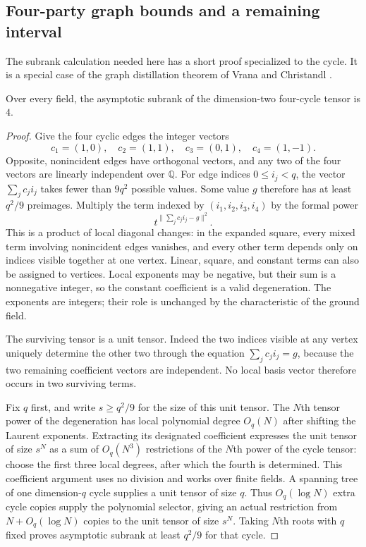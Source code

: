 \subsection{Four-party graph bounds and a remaining interval}
The subrank calculation needed here has a short proof specialized to the cycle. It is a special case of the graph distillation theorem of Vrana and Christandl \cite[Theorem 1, p.~3, and proof in Section 2]{VC2017}.

\begin{lemma}\label{lem:cycle4-subrank}
Over every field, the asymptotic subrank of the dimension-two four-cycle tensor is $4$.
\end{lemma}
\begin{proof}
Give the four cyclic edges the integer vectors
\[
 c_1=(1,0),\quad c_2=(1,1),\quad
 c_3=(0,1),\quad c_4=(1,-1).
\]
Opposite, nonincident edges have orthogonal vectors, and any two of the four vectors are linearly independent over $\mathbb Q$. For edge indices $0\leq i_j<q$, the vector $\sum_jc_ji_j$ takes fewer than $9q^2$ possible values. Some value $g$ therefore has at least $q^2/9$ preimages. Multiply the term indexed by $(i_1,i_2,i_3,i_4)$ by the formal power
\[
 t^{\|\sum_jc_ji_j-g\|^2}.
\]
This is a product of local diagonal changes: in the expanded square, every mixed term involving nonincident edges vanishes, and every other term depends only on indices visible together at one vertex. Linear, square, and constant terms can also be assigned to vertices. Local exponents may be negative, but their sum is a nonnegative integer, so the constant coefficient is a valid degeneration. The exponents are integers; their role is unchanged by the characteristic of the ground field.

The surviving tensor is a unit tensor. Indeed the two indices visible at any vertex uniquely determine the other two through the equation $\sum_jc_ji_j=g$, because the two remaining coefficient vectors are independent. No local basis vector therefore occurs in two surviving terms.

Fix $q$ first, and write $s\geq q^2/9$ for the size of this unit tensor.
The $N$th tensor power of the degeneration has local polynomial degree
$O_q(N)$ after shifting the Laurent exponents. Extracting its designated
coefficient expresses the unit tensor of size $s^N$ as a sum of
$O_q(N^3)$ restrictions of the $N$th power of the cycle tensor: choose
the first three local degrees, after which the fourth is determined.
This coefficient argument uses no division and works over finite fields.
A spanning tree of one dimension-$q$ cycle supplies a unit tensor of
size $q$. Thus $O_q(\log N)$ extra cycle copies supply the polynomial
selector, giving an actual restriction from $N+O_q(\log N)$ copies
to the unit tensor of size $s^N$. Taking $N$th roots with $q$ fixed
proves asymptotic subrank at least $q^2/9$ for that cycle.


\end{proof}
